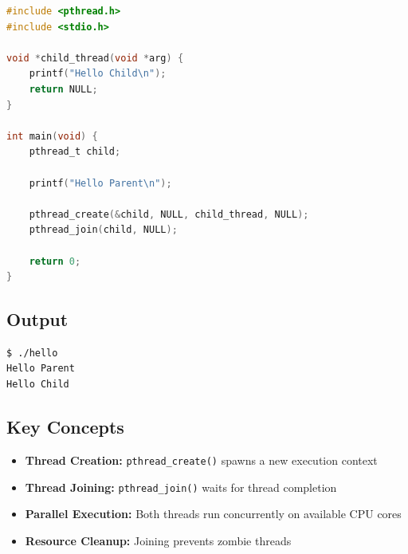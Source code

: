 \documentclass[12pt,a4paper]{article}
\begin{document}
\begin{lstlisting}[language=C, caption={Milestone 1: Basic Thread Creation}]
#include <pthread.h>
#include <stdio.h>

void *child_thread(void *arg) {
    printf("Hello Child\n");
    return NULL;
}

int main(void) {
    pthread_t child;
    
    printf("Hello Parent\n");
    
    pthread_create(&child, NULL, child_thread, NULL);
    pthread_join(child, NULL);
    
    return 0;
}
\end{lstlisting}

\subsection{Output}
\begin{tcolorbox}[colback=green!5!white,colframe=green!75!black,title=Program Output]
\begin{verbatim}
$ ./hello
Hello Parent
Hello Child
\end{verbatim}
\end{tcolorbox}

\subsection{Key Concepts}
\begin{itemize}[leftmargin=*]
    \item \textbf{Thread Creation:} \texttt{pthread\_create()} spawns a new execution context
    \item \textbf{Thread Joining:} \texttt{pthread\_join()} waits for thread completion
    \item \textbf{Parallel Execution:} Both threads run concurrently on available CPU cores
    \item \textbf{Resource Cleanup:} Joining prevents zombie threads
\end{itemize}
\end{document}
